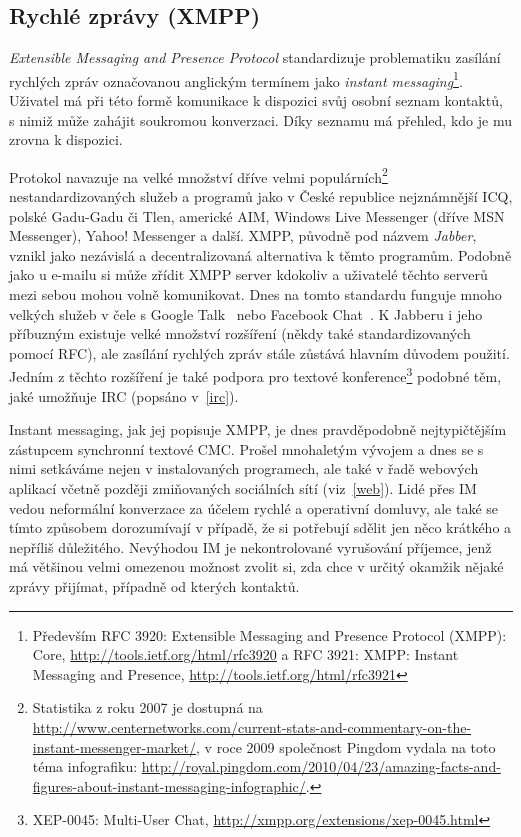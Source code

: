 \documentclass[12pt,oneside,final]{fithesis2}
\begin{document}
\subsection{Rychlé zprávy (XMPP)}\label{xmpp}
\emph{Extensible Messaging and Presence Protocol} standardizuje problematiku zasílání rychlých zpráv označovanou anglickým termínem jako \emph{instant messaging}\footnote{Především RFC 3920: Extensible Messaging and Presence Protocol (XMPP): Core, \url{http://tools.ietf.org/html/rfc3920} a RFC 3921: XMPP: Instant Messaging and Presence, \url{http://tools.ietf.org/html/rfc3921}}. Uživatel má při této formě komunikace k dispozici svůj osobní seznam kontaktů, s nimiž může zahájit soukromou konverzaci. Díky seznamu má přehled, kdo je mu zrovna k dispozici.

Protokol navazuje na velké množství dříve velmi populárních\footnote{Statistika z roku 2007 je dostupná na \url{http://www.centernetworks.com/current-stats-and-commentary-on-the-instant-messenger-market/}, v roce 2009 společnost Pingdom vydala na toto téma infografiku: \url{http://royal.pingdom.com/2010/04/23/amazing-facts-and-figures-about-instant-messaging-infographic/}.} nestandardizovaných služeb a programů jako v České republice nejznámnější ICQ, polské Gadu-Gadu či Tlen, americké AIM, Windows Live Messenger (dříve MSN Messenger), Yahoo! Messenger a další. XMPP, původně pod názvem \emph{Jabber}, vznikl jako nezávislá a decentralizovaná alternativa k těmto programům. Podobně jako u e-mailu si může zřídit XMPP server kdokoliv a uživatelé těchto serverů mezi sebou mohou volně komunikovat. Dnes na tomto standardu funguje mnoho velkých služeb v čele s Google Talk~\cite{bau2005google} nebo Facebook Chat~\cite{reiss2010facebook}. K Jabberu i jeho příbuzným existuje velké množství rozšíření (někdy také standardizovaných pomocí RFC), ale zasílání rychlých zpráv stále zůstává hlavním důvodem použití. Jedním z těchto rozšíření je také podpora pro textové konference\footnote{XEP-0045: Multi-User Chat, \url{http://xmpp.org/extensions/xep-0045.html}} podobné těm, jaké umožňuje IRC (popsáno v~\ref{irc}).

Instant messaging, jak jej popisuje XMPP, je dnes pravděpodobně nejtypičtějším zástupcem synchronní textové CMC. Prošel mnohaletým vývojem a dnes se s nimi setkáváme nejen v instalovaných programech, ale také v řadě webových aplikací včetně později zmiňovaných sociálních sítí (viz~\ref{web}). Lidé přes IM vedou neformální konverzace za účelem rychlé a operativní domluvy, ale také se tímto způsobem dorozumívají v případě, že si potřebují sdělit jen něco krátkého a nepříliš důležitého. Nevýhodou IM je nekontrolované vyrušování příjemce, jenž má většinou velmi omezenou možnost zvolit si, zda chce v určitý okamžik nějaké zprávy přijímat, případně od kterých kontaktů.
\end{document}
